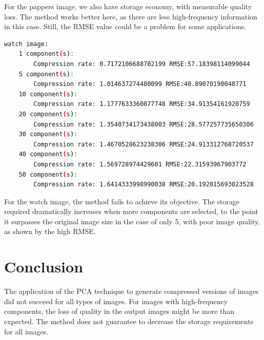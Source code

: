 \documentclass[]{IEEEtran}
\begin{document}
For the pappers image, we also have storage economy, with measurable quality loss. The method works better here, as there are less high-frequency information in this case. Still, the RMSE value could be a problem for some applications.

\begin{lstlisting}[language=sh, caption={Indicators Results for Watch Image}, label={code:watch-e}]
watch image:
	1 component(s):
		Compression rate: 0.7172106688702199 RMSE:57.18398114099044
	5 component(s):
		Compression rate: 1.014637274480099 RMSE:40.89070190048771
	10 component(s):
		Compression rate: 1.1777633360877748 RMSE:34.91354161920759
	20 component(s):
		Compression rate: 1.3540734173438003 RMSE:28.577257735650306
	30 component(s):
		Compression rate: 1.4670528623238306 RMSE:24.913312768720537
	40 component(s):
		Compression rate: 1.569728974429601 RMSE:22.31593967903772
	50 component(s):
		Compression rate: 1.6414333998990038 RMSE:20.192015693023528
\end{lstlisting}

For the watch image, the method fails to achieve its objective. The storage required dramatically increases when more components are selected, to the point it surpasses the original image size in the case of only 5, with poor image quality, as shown by the high RMSE.

\section{Conclusion}
The application of the PCA technique to generate compressed versions of images did not succeed for all types of images. For images with high-frequency components, the loss of quality in the output images might be more than expected. The method does not guarantee to decrease the storage requirements for all images.


 

\end{document}
